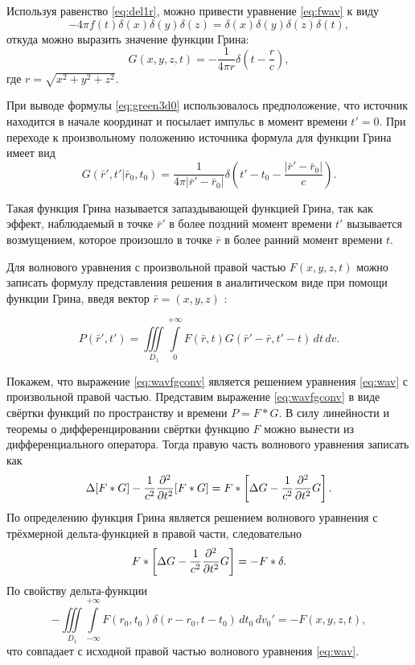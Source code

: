 \documentclass[a4paper, fontsize=14pt]{article}
\begin{document}
Используя равенство \eqref{eq:del1r}, можно привести уравнение \eqref{eq:fwav}
к виду 
\begin{equation}
	-4\pi f(t) \delta(x) \delta(y) \delta(z)  = \delta(x) \delta(y) \delta(z) \delta(t),
\label{eq:fdel}	
\end{equation}
откуда можно выразить значение функции Грина:
\begin{equation}
	G(x,y,z,t) = -\frac{1}{4\pi r} \delta \left(t - \frac{r}{c}\right),
\label{eq:green3d0}	
\end{equation}  
где $r = \sqrt{x^2+y^2+z^2}$.

При выводе формулы \eqref{eq:green3d0} использовалось предположение,  что источник находится в начале координат  и посылает импульс в момент времени $t' = 0$. При переходе к произвольному положению источника 
формула для функции Грина имеет вид
\begin{equation}
	G(\bar{r}',t'|\bar{r}_0,t_0)= \frac{1}{4\pi|\bar{r}'-\bar{r}_0|}
	\delta\left(t'-t_0-\frac{|\bar{r}'-\bar{r}_0|}{c}\right).
\label{eq:green3d}
\end{equation}

	Такая функция Грина называется запаздывающей функцией Грина, так как эффект,
	наблюдаемый в точке $\bar{r}'$ в более поздний момент времени $t'$ вызывается
	возмущением,
	которое произошло в точке $\bar{r}$ в более ранний момент времени $t$.

	
	Для волнового уравнения с произвольной правой частью $F(x,y,z,t)$ можно
	записать формулу представления решения 
	в аналитическом виде при помощи функции Грина, введя вектор $\bar{r} = (x,y,z)$ \cite{vladimirov}:
	
	
	
	\begin{equation}
		P(\bar{r}',t')=\iiint\limits_{D_1} \int\limits_{0}^{+\infty}
		F(\bar{r},t) G(\bar{r}' - \bar{r},t'- t)\,dt\,dv.
		\label{eq:wavfgconv}
	\end{equation}
	
	Покажем, что выражение \eqref{eq:wavfgconv} является решением уравнения \eqref{eq:wav} с произвольной правой частью.
	Представим выражение \eqref{eq:wavfgconv} в виде свёртки функций по пространству и времени $P = F*G$. В силу линейности  и теоремы о дифференцировании свёртки функцию $F$ можно вынести из дифференциального оператора.
	Тогда правую часть волнового уравнения записать как 
	\begin{equation}
		\Delta [F*G] -\frac{1}{c^2} \diff[2]{}{t} [F*G] = F*\left[\Delta G -\frac{1}{c^2} \diff[2]{}{t} 
		G\right].
	\end{equation}
	По определению функция Грина является решением волнового уравнения с трёхмерной дельта-функцией в правой части, следовательно
	\begin{equation*}
		F*\left[\Delta G -\frac{1}{c^2} \diff[2]{}{t} G\right] = -F * \delta.
	\end{equation*}
	По свойству дельта-функции 
	\begin{equation}
		-\iiint\limits_{D_1} \int\limits_{-\infty}^{+\infty}
		F(r_0,t_0) \delta({r} - {r}_0,t- t_0)\,dt_0\,dv_0' = -F(x,y,z,t),
	\end{equation}
	что совпадает с исходной правой частью волнового уравнения   \eqref{eq:wav}.
	
\end{document}
